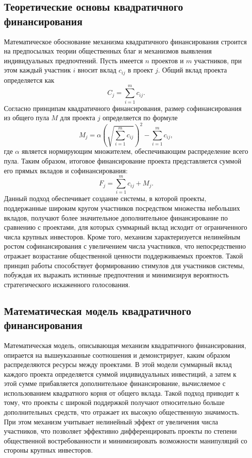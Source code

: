 \documentclass[
    candidate, %
    subf, %
    dotsinheaders=false,
]{disser}
\begin{document}
  \subsection{Теоретические основы квадратичного финансирования}

  Математическое обоснование механизма квадратичного финансирования строится на предпосылках теории общественных благ и механизмов выявления индивидуальных предпочтений. Пусть имеется $n$ проектов и $m$ участников, при этом каждый участник $i$ вносит вклад $c_{ij}$ в проект $j$. Общий вклад проекта определяется как
  \[
    C_j = \sum_{i=1}^{m} c_{ij}.
  \]
  Согласно принципам квадратичного финансирования, размер софинансирования из общего пула $M$ для проекта $j$ определяется по формуле
  \[
    M_j = \alpha \left( \sqrt{\sum_{i=1}^{m} c_{ij}} \right)^2 - \sum_{i=1}^{m} c_{ij},
  \]
  где $\alpha$ является нормирующим множителем, обеспечивающим распределение всего пула. Таким образом, итоговое финансирование проекта представляется суммой его прямых вкладов и софинансирования:
  \[
    F_j = \sum_{i=1}^{m} c_{ij} + M_j.
  \]
  Данный подход обеспечивает создание системы, в которой проекты, поддержанные широким кругом участников посредством множества небольших вкладов, получают более значительное дополнительное финансирование по сравнению с проектами, для которых суммарный вклад исходит от ограниченного числа крупных инвесторов. Кроме того, механизм характеризуется нелинейным ростом софинансирования с увеличением числа участников, что непосредственно отражает возрастание общественной ценности поддерживаемых проектов. Такой принцип работы способствует формированию стимулов для участников системы, побуждая их выражать истинные предпочтения и минимизируя вероятность стратегического искаженного голосования.

  \subsection{Математическая модель квадратичного финансирования}

  Математическая модель, описывающая механизм квадратичного финансирования, опирается на вышеуказанные соотношения и демонстрирует, каким образом распределяются ресурсы между проектами. В этой модели суммарный вклад каждого проекта определяется суммой индивидуальных инвестиций, а затем к этой сумме прибавляется дополнительное финансирование, вычисляемое с использованием квадратного корня от общего вклада. Такой подход приводит к тому, что проекты с широкой поддержкой получают относительно больше дополнительных средств, что отражает их высокую общественную значимость. При этом механизм учитывает нелинейный эффект от увеличения числа участников, что позволяет эффективно дифференцировать проекты по степени общественной востребованности и минимизировать возможности манипуляций со стороны крупных инвесторов.
\end{document}
